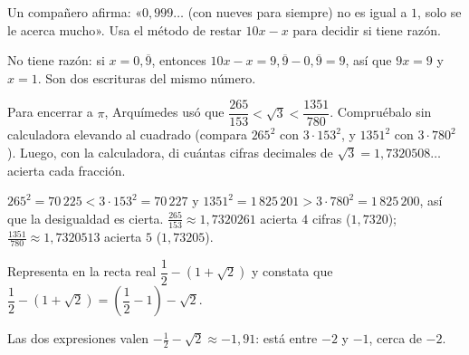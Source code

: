 \documentclass[11pt]{article}
\begin{document}
\begin{preguntas}
\pregunta[1] Un compañero afirma: «$0{,}999\ldots$ (con nueves para siempre) no es igual a $1$,
solo se le acerca mucho». Usa el método de restar $10x - x$ para decidir si tiene razón.
\espacio{2.5cm}
\newpage
\begin{solucion}
No tiene razón: si $x = 0{,}\overline{9}$, entonces
$10x - x = 9{,}\overline{9} - 0{,}\overline{9} = 9$, así que $9x = 9$ y $x = 1$. Son dos
escrituras del mismo número.
\end{solucion}

\pregunta[1] Para encerrar a $\pi$, Arquímedes usó que $\dfrac{265}{153} < \sqrt{3} <
\dfrac{1351}{780}$. Compruébalo sin calculadora elevando al cuadrado (compara $265^2$ con
$3 \cdot 153^2$, y $1351^2$ con $3 \cdot 780^2$). Luego, con la calculadora, di cuántas cifras
decimales de $\sqrt{3} = 1{,}7320508\ldots$ acierta cada fracción.
\espacio{3cm}
\begin{solucion}
$265^2 = 70\,225 < 3 \cdot 153^2 = 70\,227$ y $1351^2 = 1\,825\,201 > 3 \cdot 780^2 =
1\,825\,200$, así que la desigualdad es cierta. $\frac{265}{153} \approx 1{,}7320261$ acierta
$4$ cifras ($1{,}7320$); $\frac{1351}{780} \approx 1{,}7320513$ acierta $5$ ($1{,}73205$).
\end{solucion}

\pregunta[1] Representa en la recta real $\dfrac{1}{2} - (1 + \sqrt{2})$ y constata que
$\dfrac{1}{2} - (1 + \sqrt{2}) = \left(\dfrac{1}{2} - 1\right) - \sqrt{2}$.
\espacio{3cm}
\begin{solucion}
Las dos expresiones valen $-\frac{1}{2} - \sqrt{2} \approx -1{,}91$: está entre $-2$ y $-1$,
cerca de $-2$.
\end{solucion}

\end{preguntas}
\end{document}
